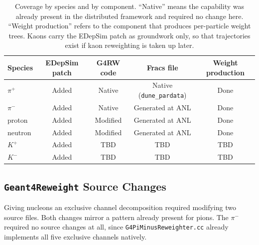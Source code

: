 \documentclass[%
article,
nofootinbib
]{revtex4-2}
\begin{document}
\begin{table}[H]
\centering
\caption{Coverage by species and by component. ``Native'' means the
capability was already present in the distributed framework and required no
change here. ``Weight production'' refers to the component that produces
per-particle weight trees. Kaons carry the EDepSim patch as groundwork only, so
that trajectories exist if kaon reweighting is taken up later.}
\label{tab:species_status}
\setlength{\tabcolsep}{12pt}
\begin{tabular}{lcccc}
\hline\hline
Species & EDepSim patch & G4RW code & Fracs file & Weight production \\
\hline
$\pi^{+}$ & Added   & Native      & Native (\texttt{dune\_pardata}) & Done \\
$\pi^{-}$ & Added   & Native      & Generated at ANL                  & Done \\
proton    & Added   & Modified    & Generated at ANL                  & Done \\
neutron   & Added    & Modified    & Generated at ANL                  & Done \\
$K^{+}$   & Added    & TBD & TBD                     & TBD \\
$K^{-}$   & Added    & TBD & TBD                     & TBD \\
\hline\hline
\end{tabular}
\end{table}

%

\subsection{\label{subsec:code_changes}\texttt{Geant4Reweight} Source Changes}

Giving nucleons an exclusive channel decomposition required modifying two
source files. Both changes mirror a pattern already present for pions. 
The $\pi^{-}$ required no source changes at all, since
\texttt{G4PiMinusReweighter.cc} already implements all five exclusive
channels natively.
\end{document}
